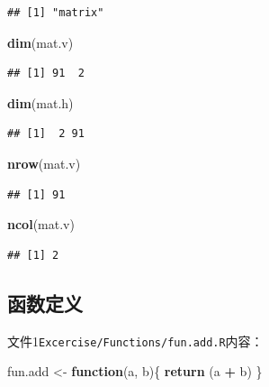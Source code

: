 \documentclass[]{scrbook}
\newenvironment{Shaded}{\begin{snugshade}}{\end{snugshade}}
\newcommand{\ControlFlowTok}[1]{\textcolor[rgb]{0.13,0.29,0.53}{\textbf{#1}}}
\newcommand{\KeywordTok}[1]{\textcolor[rgb]{0.13,0.29,0.53}{\textbf{#1}}}
\newcommand{\NormalTok}[1]{#1}
\newcommand{\OperatorTok}[1]{\textcolor[rgb]{0.81,0.36,0.00}{\textbf{#1}}}
\newcommand{\StringTok}[1]{\textcolor[rgb]{0.31,0.60,0.02}{#1}}
\begin{document}
\begin{verbatim}
## [1] "matrix"
\end{verbatim}

\begin{Shaded}
\begin{Highlighting}[]
\KeywordTok{dim}\NormalTok{(mat.v)}
\end{Highlighting}
\end{Shaded}

\begin{verbatim}
## [1] 91  2
\end{verbatim}

\begin{Shaded}
\begin{Highlighting}[]
\KeywordTok{dim}\NormalTok{(mat.h)}
\end{Highlighting}
\end{Shaded}

\begin{verbatim}
## [1]  2 91
\end{verbatim}

\begin{Shaded}
\begin{Highlighting}[]
\KeywordTok{nrow}\NormalTok{(mat.v)}
\end{Highlighting}
\end{Shaded}

\begin{verbatim}
## [1] 91
\end{verbatim}

\begin{Shaded}
\begin{Highlighting}[]
\KeywordTok{ncol}\NormalTok{(mat.v)}
\end{Highlighting}
\end{Shaded}

\begin{verbatim}
## [1] 2
\end{verbatim}

\hypertarget{ux51fdux6570ux5b9aux4e49}{%
\subsection{函数定义}\label{ux51fdux6570ux5b9aux4e49}}

文件1\texttt{Excercise/Functions/fun.add.R}内容：

\begin{Shaded}
\begin{Highlighting}[]
\NormalTok{fun.add \textless{}{-}}\StringTok{ }\ControlFlowTok{function}\NormalTok{(a, b)\{}
  \KeywordTok{return}\NormalTok{ (a }\OperatorTok{+}\StringTok{ }\NormalTok{b)}
\NormalTok{\}}
\end{Highlighting}
\end{Shaded}
\end{document}
